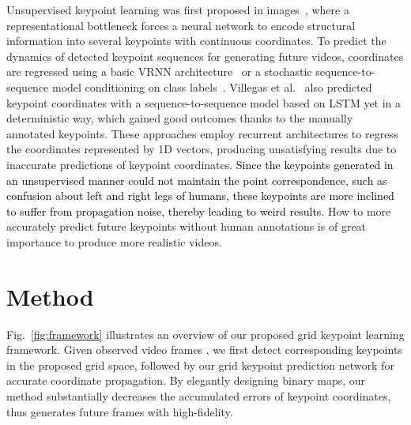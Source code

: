 \documentclass[letterpaper, 10 pt, conference]{ieeeconf}
\newcommand{\gao}[1]{{\textcolor{black}{#1}}}
\begin{document}
Unsupervised keypoint learning was first proposed in images~\cite{jakab2018unsupervised,zhang2018unsupervised}, where a representational bottleneck forces a neural network to encode structural information into several keypoints with continuous coordinates.
To predict the dynamics of detected keypoint sequences for generating future videos, coordinates are regressed using a basic VRNN architecture~\cite{minderer2019unsupervised} or a stochastic sequence-to-sequence model conditioning on class labels~\cite{kim2019unsupervised}.
Villegas et al.~\cite{villegas2017learning} also predicted keypoint coordinates with a sequence-to-sequence model based on LSTM yet in a deterministic way, which gained good outcomes thanks to the manually annotated keypoints. 
These approaches employ recurrent architectures to regress the coordinates represented by 1D vectors, producing unsatisfying results due to inaccurate predictions of keypoint coordinates. 
\gao{Since the keypoints generated in an unsupervised manner could not maintain the point correspondence, such as confusion about left and right legs of humans, these keypoints are more inclined to suffer from propagation noise, thereby leading to weird results.}
How to more accurately predict future keypoints without human annotations is of great importance to produce more realistic videos.

\section{Method}
Fig.~\ref{fig:framework} illustrates an overview of our proposed grid keypoint learning framework. 
Given observed video frames , we first detect corresponding keypoints in the proposed grid space, followed by our grid keypoint prediction network for accurate coordinate propagation. 
By elegantly designing binary maps, our method substantially decreases the accumulated errors of keypoint coordinates, thus generates future frames  with high-fidelity. 
\end{document}
